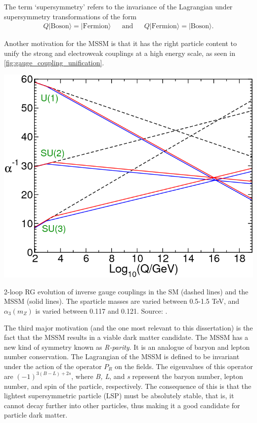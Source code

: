 The term `supersymmetry' refers to the invariance of the Lagrangian under supersymmetry transformations of the form
\begin{align*}
  Q|\text{Boson}\rangle = |\text{Fermion}\rangle &&\text{and}&& Q|\text{Fermion}\rangle = |\text{Boson}\rangle.
\end{align*}

Another motivation for the MSSM is that it has the right particle content to unify the strong and electroweak couplings at a high energy scale, as seen in \autoref{fig:gauge_coupling_unification}.

\begin{marginfigure}[-4cm]
    \includegraphics[width=\textwidth]{images/gauge_coupling_unification}
  \caption{2-loop RG evolution of inverse gauge couplings in the SM (dashed lines) and the MSSM (solid lines). The sparticle masses are varied between 0.5-1.5 TeV, and $\alpha_3(m_Z)$ is varied between 0.117 and 0.121. Source: \citep{Martin1997}.}
  \label{fig:gauge_coupling_unification}
\end{marginfigure}

The third major motivation (and the one most relevant to this dissertation) is the fact that the MSSM results in a viable dark matter candidate. The MSSM has a new kind of symmetry known as \emph{R-parity}. It is an analogue of baryon and lepton number conservation. The Lagrangian of the MSSM is defined to be invariant under the action of the operator $P_R$ on the fields. The eigenvalues of this operator are $(-1)^{3(B-L)+2s}$, where \emph{B, L}, and \emph{s} represent the baryon number, lepton number, and spin of the particle, respectively. The consequence of this is that the lightest supersymmetric particle (LSP) must be absolutely stable, that is, it cannot decay further into other particles, thus making it a good candidate for particle dark matter.


